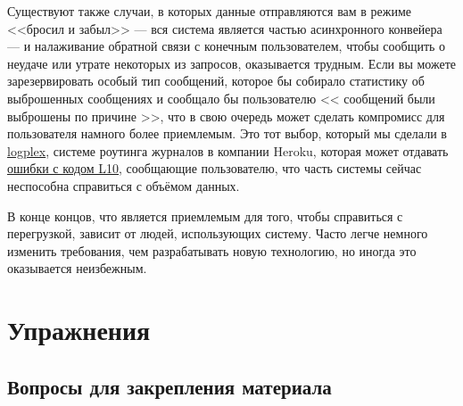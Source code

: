 \documentclass[11pt, oneside]{book}   	%
\newcommand{\ReviewTitle}{Вопросы для закрепления материала}
\begin{document}
Существуют также случаи, в которых данные отправляются вам в режиме <<бросил и забыл>> --- вся система является частью асинхронного конвейера --- и налаживание обратной связи с конечным пользователем, чтобы сообщить о неудаче или утрате некоторых из запросов, оказывается трудным. Если вы можете зарезервировать особый тип сообщений, которое бы собирало статистику об выброшенных сообщениях и сообщало бы пользователю << сообщений были выброшены по причине >>, что в свою очередь может сделать компромисс для пользователя намного более приемлемым. Это тот выбор, который мы сделали в \href{https://devcenter.heroku.com/articles/logplex}{logplex}, системе роутинга журналов в компании Heroku, которая может отдавать \href{https://devcenter.heroku.com/articles/error-codes\#l10-drain-buffer-overflow}{ошибки с кодом L10}, сообщающие пользователю, что часть системы сейчас неспособна справиться с объёмом данных.

В конце концов, что является приемлемым для того, чтобы справиться с перегрузкой, зависит от людей, использующих систему. Часто легче немного изменить требования, чем разрабатывать новую технологию, но иногда это оказывается неизбежным.


\section{Упражнения}

\subsection*{\ReviewTitle{}}
\end{document}
